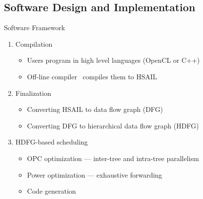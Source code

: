 \documentclass[handout]{beamer}
\begin{document}
\begin{CJK}{UTF8}{bkai}
            \subsection{Software Design and Implementation}
            \begin{frame}{Software Framework}
                \begin{enumerate}
                    \item <2->{Compilation
                            \begin{itemize}
                                \item Users program in high level languages (OpenCL or C++)
                                \item Off-line compiler~ compiles them to HSAIL
                            \end{itemize}
                        }
                    \item <3->{Finalization
                            \begin{itemize}
                                \item Converting HSAIL to data flow graph (DFG)
                                \item Converting DFG to hierarchical data flow graph (HDFG)
                            \end{itemize}
                        }
                    \item <4->{HDFG-based scheduling
                            \begin{itemize}
                                \item OPC optimization --- inter-tree and intra-tree parallelism
                                \item Power optimization --- exhaustive forwarding
                                \item Code generation
                            \end{itemize}
                        }
                \end{enumerate}
            \end{frame}



\end{CJK}
\end{document}

